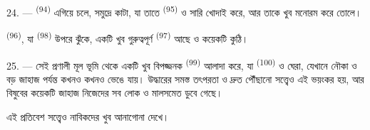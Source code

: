 \VUsaut{3.0mm}
\VUsaut{3.0mm}

24. ---  \textsuperscript{(94)} এগিয়ে চলে, সমুদ্রে কাটা, যা
তাতে  \textsuperscript{(95)} ও  সারি খোদাই
করে, আর তাকে খুব মনোরম করে তোলে।

 \textsuperscript{(96)}, যা 
\textsuperscript{(98)} উপরে ঝুঁকে, একটি খুব গুরুত্বপূর্ণ 
\textsuperscript{(97)} আছে ও কয়েকটি কুঠি।

25. --- সেই প্রণালী মূল ভূমি থেকে একটি খুব বিপজ্জনক 
\textsuperscript{(99)} আলাদা করে, যা  \textsuperscript{(100)} ও
 ঘেরা, যেখানে নৌকা ও বড় জাহাজ পর্যন্ত কখনও কখনও ভেঙে
যায়। উদ্ধারের সমস্ত তৎপরতা ও  দ্রুত পৌঁছানো সত্ত্বেও এই
 ভয়ংকর হয়, আর বিষুবের  কয়েকটি জাহাজ নিজেদের
সব লোক ও মালসমেত ডুবে গেছে।

এই প্রতিবেশ সত্ত্বেও  নাবিকদের খুব আনাগোনা দেখে।
\VUsaut{6.0mm}
\VUfilet{22mm}
